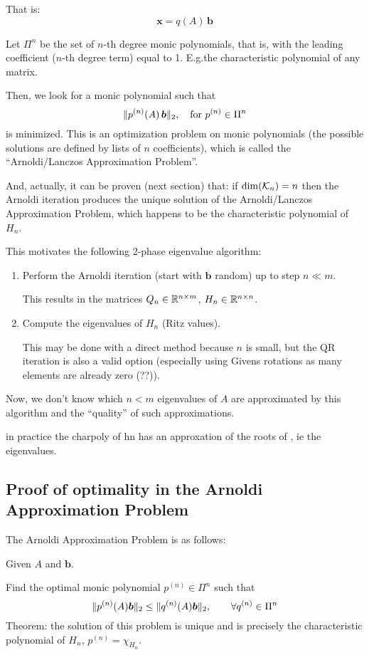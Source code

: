 \documentclass[
  12pt,
  paper=a4,
]{scrartcl} %
\begin{document}
That is:
\[
    \bm x = q(A)\,\bm b
\]

Let $\Pi^n$ be the set of $n$-th degree monic polynomials, that is, with the leading coefficient ($n$-th degree term) equal to 1. E.g.\@ the characteristic polynomial of any matrix.

Then, we look for a monic polynomial such that
\[
    \|p^{(n)}(A)\,\bm b\|_2, \quad \text{for }p^{(n)}\in \Pi^n
\]
is minimized. This is an optimization problem on monic polynomials (the possible solutions are defined by lists of $n$ coefficients), which is called the ``Arnoldi/Lanczos Approximation Problem''.

And, actually, it can be proven (next section) that: if $\dim(\mathcal{K}_n)=n$ then the Arnoldi iteration produces the unique solution of the Arnoldi/Lanczos Approximation Problem, which happens to be the characteristic polynomial of $H_n$.

This motivates the following 2-phase eigenvalue algorithm:
\begin{enumerate}
    \item Perform the Arnoldi iteration (start with $\bm b$ random) up to step $n\ll m$.
    
    This results in the matrices $Q_n\in \mathbb R^{n\times m}$, $H_n\in\mathbb R^{n\times n}$.
    
    \item Compute the eigenvalues of $H_n$ (Ritz values).
    
    This may be done with a direct method because $n$ is small, but the QR iteration is also a valid option (especially using Givens rotations as many elements are already zero (??)).
\end{enumerate}

Now, we don't know which $n<m$ eigenvalues of $A$ are approximated by this algorithm and the ``quality'' of such approximations.

in practice the charpoly of hn has an approxation of the roots of , ie the eigenvalues.

\newpage
\subsection*{Proof of optimality in the Arnoldi Approximation Problem}

The Arnoldi Approximation Problem is as follows:

Given $A$ and $\bm b$.

Find the optimal monic polynomial $p^{(n)}\in \Pi^n$ such that
\[
    \|p^{(n)}(A)\bm b\|_2 \le \|q^{(n)}(A)\bm b\|_2,
    \qquad \forall  q^{(n)}\in \Pi^n
\]
Theorem: the solution of this problem is unique and is precisely the characteristic polynomial of $H_n$, $p^{(n)} = \chi_{H_n}$.
\end{document}

